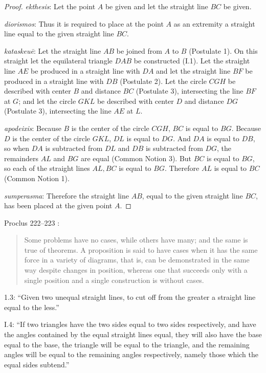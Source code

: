 \documentclass{article}
\begin{document}
\begin{proof}
{\em ekthesis}: Let the point $A$ be given and let  the straight line $BC$ be given.

{\em diorismos}: Thus it is required to place at the point $A$ as an extremity 
a straight line equal to the given straight line $BC$.

{\em kataskeu\={e}}: Let the  straight line $AB$ be joined from $A$ to $B$ (Postulate 1).
On this straight let the equilateral triangle $DAB$ be constructed (I.1).
Let the straight line $AE$ be produced in a straight line with $DA$ and let the straight line
$BF$ be produced in a straight line with $DB$ (Postulate 2).
Let the circle $CGH$ be described with center $B$ and distance $BC$ (Postulate 3), intersecting the line
$BF$ at $G$; and
let the circle $GKL$ be described with center $D$ and distance $DG$ (Postulate 3), intersecting the line
$AE$ at $L$.

{\em apodeixis}: Because $B$ is the center of the circle $CGH$, $BC$ is equal to $BG$.
Because $D$ is the center of the circle $GKL$, $DL$ is equal to $DG$.
And $DA$ is equal to $DB$, so when $DA$ is subtracted from $DL$ and 
$DB$ is subtracted from $DG$, the remainders $AL$ and $BG$ are equal (Common Notion 3).
But $BC$ is equal to $BG$, so each of the straight lines $AL,BC$ is equal to $BG$.
Therefore $AL$ is equal to $BC$ (Common Notion 1).

{\em sumperasma}: Therefore the straight line $AB$, equal to the given straight line $BC$,
has been placed at the given point $A$.
\end{proof}

Proclus 222--223 \cite[p.~174]{proclus}:

\begin{quote}
Some problems have no cases, while others have many;
and the same is true of theorems. A proposition is said to have
cases when it has the same force in a variety of diagrams,
that is, can be demonstrated in the same way despite changes
in position, whereas one that succeeds only with a single position
and a single construction is without cases.
\end{quote}

1.3: ``Given two unequal straight lines, to cut off from the 
greater a straight line equal to the less.''

I.4: ``If two triangles have the two sides equal to two sides
respectively, and have the angles contained by the equal straight
lines equal, they will also have the base equal to the base, the
triangle will be equal to the triangle, and the remaining angles
will be equal to the remaining angles respectively, namely those
which the equal sides subtend.''
\end{document}
